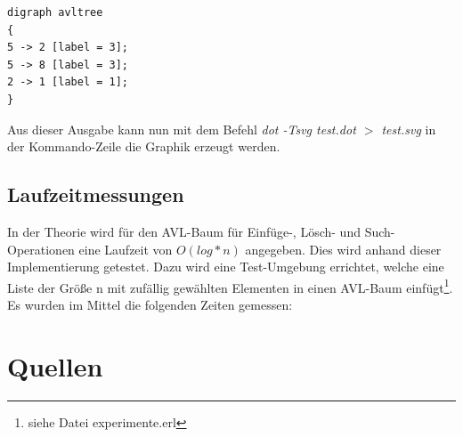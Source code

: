 \documentclass{article}
\begin{document}
\begin{lstlisting}
digraph avltree
{
5 -> 2 [label = 3];
5 -> 8 [label = 3];
2 -> 1 [label = 1];
}
\end{lstlisting}

	Aus dieser Ausgabe kann nun mit dem Befehl \textit{dot -Tsvg test.dot $>$ test.svg} in der Kommando-Zeile die Graphik erzeugt werden.
	
	\newpage
	\subsection{Laufzeitmessungen}
	In der Theorie wird für den AVL-Baum für Einfüge-, Lösch- und Such-Operationen eine Laufzeit von $O(log*n)$ angegeben. Dies wird anhand dieser Implementierung getestet. Dazu wird eine Test-Umgebung errichtet, welche eine Liste der Größe n mit zufällig gewählten Elementen in einen AVL-Baum einfügt\footnote{siehe Datei experimente.erl}. Es wurden im Mittel die folgenden Zeiten gemessen:
	
	
  	\newpage
  	\section{Quellen}
\end{document}

